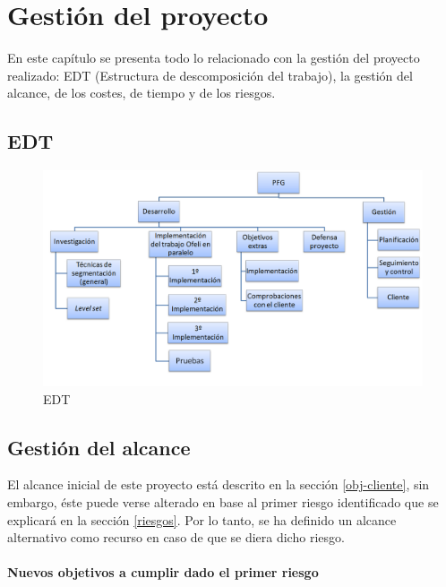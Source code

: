 \chapter{Gesti\'{o}n del proyecto}

En este cap\'{i}tulo se presenta todo lo relacionado con la gesti\'{o}n del proyecto realizado: EDT (Estructura de descomposici\'{o}n del trabajo), la gesti\'{o}n del alcance, de los costes, de tiempo y de los riesgos.

\section{EDT}

\begin{figure}[H]
	\captionsetup{justification=centering}
	\centering
	\includegraphics[width=1.2\textwidth]{./imagenes/EDT}
	\caption{EDT}	
	\label{EDT}
\end{figure}


\section{Gesti\'{o}n del alcance}\label{alcance}
 
El alcance inicial de este proyecto est\'{a} descrito en la secci\'{o}n \ref{obj-cliente}, sin embargo, \'{e}ste puede verse alterado en base al primer riesgo identificado que se explicar\'{a} en la secci\'{o}n \ref{riesgos}. Por lo tanto, se ha definido un alcance alternativo como recurso en caso de que se diera dicho riesgo.

\subsubsection{Nuevos objetivos a cumplir dado el primer riesgo}


